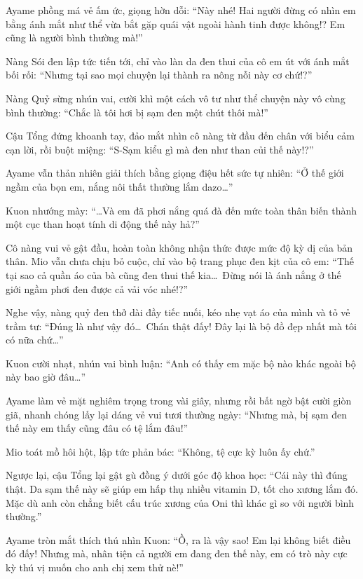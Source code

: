 \documentclass[../main.tex]{subfiles}
\begin{document}
Ayame phồng má vẻ ấm ức, giọng hờn dỗi:
``Này nhé! Hai người đừng có nhìn em bằng ánh mắt như thể vừa bắt gặp quái vật ngoài hành tinh được không!? Em cũng là người bình thường mà!''

Nàng Sói đen lập tức tiến tới, chỉ vào làn da đen thui của cô em út với ánh mắt bối rối: ``Nhưng tại sao mọi chuyện lại thành ra nông nỗi này cơ chứ!?''

Nàng Quỷ sừng nhún vai, cười khì một cách vô tư như thể chuyện này vô cùng bình thường:
``Chắc là tôi hơi bị sạm đen một chút thôi mà!''

Cậu Tổng đứng khoanh tay, đảo mắt nhìn cô nàng từ đầu đến chân với biểu cảm cạn lời, rồi buột miệng:
``S-Sạm kiểu gì mà đen như than củi thế này!?''

Ayame vẫn thản nhiên giải thích bằng giọng điệu hết sức tự nhiên:
``Ở thế giới ngầm của bọn em, nắng nôi thất thường lắm dazo\dots''

Kuon nhướng mày:
``\dots Và em đã phơi nắng quá đà đến mức toàn thân biến thành một cục than hoạt tính di động thế này hả?''

Cô nàng vui vẻ gật đầu, hoàn toàn không nhận thức được mức độ kỳ dị của bản thân. Mio vẫn chưa chịu bỏ cuộc, chỉ vào bộ trang phục đen kịt của cô em:
``Thế tại sao cả quần áo của bà cũng đen thui thế kia\dots\ Đừng nói là ánh nắng ở thế giới ngầm phơi đen được cả vải vóc nhé!?''

Nghe vậy, nàng quỷ đen thở dài đầy tiếc nuối, kéo nhẹ vạt áo của mình và tỏ vẻ trầm tư:
``Đúng là như vậy đó\dots\ Chán thật đấy! Đây lại là bộ đồ đẹp nhất mà tôi có nữa chứ\dots''

Kuon cười nhạt, nhún vai bình luận:
``Anh có thấy em mặc bộ nào khác ngoài bộ này bao giờ đâu\dots''

Ayame làm vẻ mặt nghiêm trọng trong vài giây, nhưng rồi bất ngờ bật cười giòn giã, nhanh chóng lấy lại dáng vẻ vui tươi thường ngày:
``Nhưng mà, bị sạm đen thế này em thấy cũng đâu có tệ lắm đâu!''

Mio toát mồ hôi hột, lập tức phản bác:
``Không, tệ cực kỳ luôn ấy chứ.''

Ngược lại, cậu Tổng lại gật gù đồng ý dưới góc độ khoa học:
``Cái này thì đúng thật. Da sạm thế này sẽ giúp em hấp thụ nhiều vitamin D, tốt cho xương lắm đó. Mặc dù anh còn chẳng biết cấu trúc xương của Oni thì khác gì so với người bình thường.''

Ayame tròn mắt thích thú nhìn Kuon:
``Ồ, ra là vậy sao! Em lại không biết điều đó đấy! Nhưng mà, nhân tiện cả người em đang đen thế này, em có trò này cực kỳ thú vị muốn cho anh chị xem thử nè!''
\end{document}
